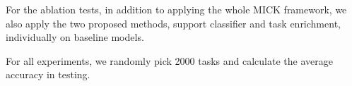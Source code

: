 For the ablation tests, in addition to applying the whole MICK framework, we also apply the two proposed methods, support classifier and task enrichment, individually on baseline models.

For all experiments, we randomly pick 2000 tasks and calculate the average accuracy in testing.


